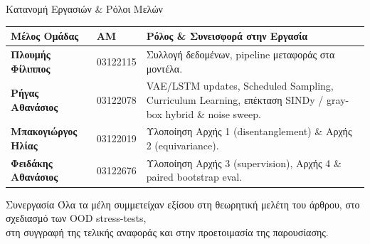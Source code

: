 \documentclass[10pt, aspectratio=169]{beamer}
\begin{document}
\begin{frame}{Κατανομή Εργασιών \& Ρόλοι Μελών}
    \centering
    \renewcommand{\arraystretch}{1.25}
    \footnotesize
    \begin{tabular}{l l p{7.5cm}}
        \toprule
        \textbf{Μέλος Ομάδας} & \textbf{ΑΜ} & \textbf{Ρόλος \& Συνεισφορά στην Εργασία} \\
        \midrule
        \textbf{Πλουμής Φίλιππος} & 03122115 & Συλλογή δεδομένων, pipeline μεταφοράς στα μοντέλα. \\
        \textbf{Ρήγας Αθανάσιος} & 03122078 & VAE/LSTM updates, Scheduled Sampling, Curriculum Learning, επέκταση SINDy / gray-box hybrid \& noise sweep. \\
        \textbf{Μπακογιώργος Ηλίας} & 03122019 & Υλοποίηση Αρχής 1 (disentanglement) \& Αρχής 2 (equivariance). \\
        \textbf{Φειδάκης Αθανάσιος} & 03122676 & Υλοποίηση Αρχής 3 (supervision), Αρχής 4 \& paired bootstrap eval. \\
        \bottomrule
    \end{tabular}
    \vspace{0.4cm}
    \begin{block}{Συνεργασία}
        \scriptsize Όλα τα μέλη συμμετείχαν εξίσου στη θεωρητική μελέτη του άρθρου, στο σχεδιασμό των OOD stress-tests,\\ στη συγγραφή της τελικής αναφοράς και στην προετοιμασία της παρουσίασης.
    \end{block}
\end{frame}

\end{document}

